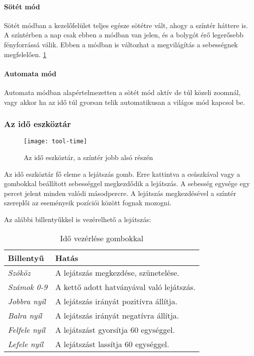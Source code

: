 \paragraph{Sötét mód}

Sötét módban a kezelőfelület teljes egésze sötétre vált, ahogy a színtér háttere is. A színtérben a nap csak ebben a módban van jelen, és a bolygót érő legerősebb fényforrássá válik. Ebben a módban is változhat a megvilágítás a sebességnek megfelelően. \ref{fig:tool-time}

\paragraph{Automata mód}

Automata módban alapértelmezetten a sötét mód aktív de túl közeli zoomnál, vagy akkor ha az idő túl gyorsan telik automatikusan a világos mód kapcsol be.


\subsubsection{Az idő eszköztár}

\begin{figure}[h!]
	\centering
	\texttt{[image: tool-time]}
	\caption{Az idő eszköztár, a színtér jobb alsó részén}
	\label{fig:tool-time}
\end{figure}

Az idő eszköztár fő eleme a lejátszás gomb. Erre kattintva a csúszkával vagy a gombokkal beállított sebességgel megkezdődik a lejátszás. A sebesség egysége egy percet jelent minden valódi másodpercre. A lejátszás megkezdésével a színtér szereplői az eseményeik pozíciói között fognak mozogni.

Az alábbi billentyűkkel is vezérelhető a lejátszás:

\begin{table}[H]
	\centering
	\begin{tabular}{ | m{} | m{} | }
		\hline
		\textbf{Billentyű} & \textbf{Hatás}\\
		\hline \hline
		\emph{Szóköz} & A lejátszás megkezdése, szünetelése. \\
		\hline
		\emph{Számok 0-9} & A kettő adott hatványával való lejátszás. \\
		\hline
		\emph{Jobbra nyíl} & A lejátszás irányát pozitívra állítja.  \\
		\hline
		\emph{Balra nyíl} & A lejátszás irányát negatívra állítja.  \\
		\hline
		\emph{Felfele nyíl} & A lejátszást gyorsítja 60 egységgel. \\
		\hline
		\emph{Lefele nyíl} & A lejátszást lassítja 60 egységgel.  \\
		\hline
	\end{tabular}
	\caption{Idő vezérlése gombokkal}
	\label{tab:tool-time-control-keys}
\end{table}

